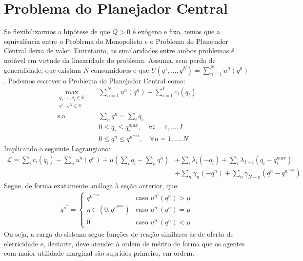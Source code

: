 \section{Problema do Planejador Central}
Se flexibilizarmos a hipótese de que $\overline{Q}>0$ é exógeno e fixo, temos que a equivalência entre o Problema do Monopolista e o Problema do Planejador Central deixa de valer. Entretanto, as similaridades entre ambos problemas é notável em virtude da linearidade do problema. Assuma, sem perda de generalidade, que existam $N$ consumidores e que $U(q^1,\hdots,q^N)=\sum_{n=1}^Nu^n(q^n)$. Podemos escrever o Problema do Planejador Central como:
\begin{align*}
    \max_{\substack{q_1,\hdots,q_I\in\mathbb{R}\\q^1\hdots q^N\in\mathbb{R}}}&\quad \sum_{n=1}^Nu^n(q^n) - \sum_{i=1}^Ic_i(q_i)\\
    \text{s.a}&\quad \sum_nq^n=\sum_iq_i\\
    &\quad 0\le q_i \le q_i^{max},\quad \forall i=1,\hdots,I\\
    &\quad 0\le q^n \le q^{n^{max}},\quad \forall n=1,\hdots,N
\end{align*}
Implicando o seguinte Lagrangiano: 
\begin{align*}
    \mathcal{L}=\sum_ic_i(q_i)-\sum_nu^n(q^n)+\mu\left(\sum_iq_i-\sum_nq^n\right)&+\sum_i\lambda_i(-q_i) + \sum_i\lambda_{I+i}(q_i-q_i^{max})\\
    &+\sum_{n}\gamma_n(-q^n) + \sum_n\gamma_{N+n}(q^n-q^{n^{max}})
\end{align*}
Segue, de forma exatamente análoga à seção anterior, que:
\begin{align*}
    q^{n^*}=\begin{cases}
        q^{n^{max}} & \text{caso $u^{n'}(q^n)>\mu$}\\
        \eta \in(0,q^{n^{max}}) & \text{caso $u^{n'}(q^n)=\mu$}\\
        0 & \text{caso $u^{n'}(q^n)<\mu$}
    \end{cases}
\end{align*}
Ou seja, a carga do sistema segue funções de reação similares às de oferta de eletricidade e, destarte, deve atender à ordem de mérito de forma que os agentes com maior utilidade marginal são supridos primeiro, em ordem.